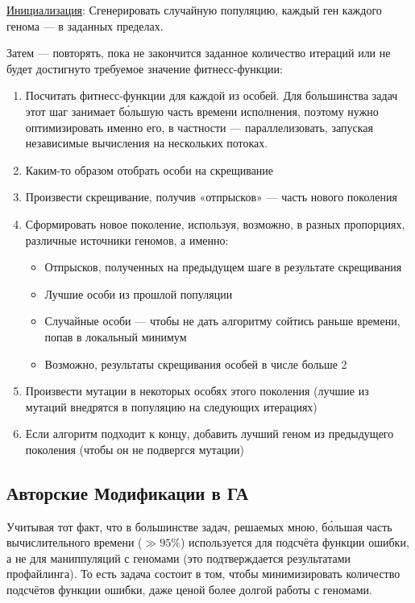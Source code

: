 \underline{Инициализация}: Сгенерировать случайную популяцию, каждый ген каждого генома — в заданных пределах.

Затем — повторять, пока не закончится заданное количество итераций или не будет достигнуто требуемое значение фитнесс-функции:
\begin{enumerate}
    \item Посчитать фитнесс-функции для каждой из особей.
    Для большинства задач этот шаг занимает бо́льшую часть времени исполнения, поэтому нужно оптимизировать именно его, в частности — параллелизовать, запуская независимые вычисления на нескольких потоках.
    \item Каким-то образом отобрать особи на скрещивание
    \item Произвести скрещивание, получив «отпрысков» — часть нового поколения
    \item Сформировать новое поколение, используя, возможно, в разных пропорциях, различные источники геномов, а именно:
            \begin{itemize}
                \item Отпрысков, полученных на предыдущем шаге в результате скрещивания
                \item Лучшие особи из прошлой популяции
                \item Случайные особи —  чтобы не дать алгоритму сойтись раньше времени, попав в локальный минимум
                \item Возможно, результаты скрещивания особей в числе больше 2
            \end{itemize}
    \item Произвести мутации в некоторых особях этого поколения (лучшие из мутаций внедрятся в популяцию на следующих итерациях)
    \item Если алгоритм подходит к концу, добавить лучший геном из предыдущего поколения (чтобы он не подвергся мутации)
\end{enumerate}

\subsection{Авторские Модификации  в ГА}\label{sec:my_modifications}

Учитывая тот факт, что в большинстве задач, решаемых мною, бо́льшая часть вычислительного времени ($\gg 95\%$) используется для подсчёта функции ошибки, а не для маниппуляций с геномами
(это подтверждается результатами профайлинга).
То есть задача состоит в том, чтобы минимизировать количество подсчётов функции ошибки, даже ценой более долгой работы с геномами.

